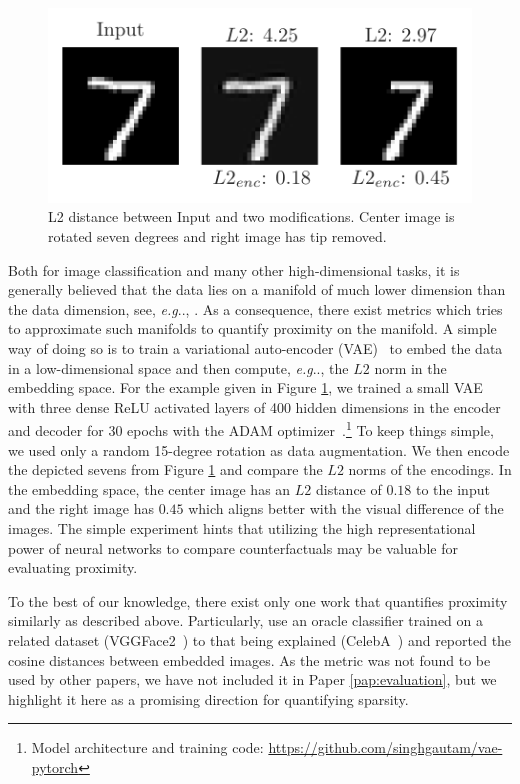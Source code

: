 \documentclass[11pt,a4paper,twoside,openright,final]{memoir}
\makeatletter
\DeclareRobustCommand\onedot{\futurelet\@let@token\@onedot}
\def\@onedot{\ifx\@let@token.\else.\null\fi\xspace}
\def\eg{\emph{e.g}\onedot} \def\Eg{\emph{E.g}\onedot}
\newcommand*{\paperref}[1]{Paper \hyperref[#1]{\ref{#1}}}
\makeatother
\begin{document}
\begin{figure}
    \centering
    \includegraphics{graphics/l2-example.pdf}
    \caption{L2 distance between Input and two modifications. Center image is rotated seven degrees and right image has tip removed.}
    \label{fig:l2-example}
\end{figure}

Both for image classification and many other high-dimensional tasks, it is generally believed that the data lies on a manifold of much lower dimension than the data dimension, see, \eg, \cite[Sec. 3.11.3]{Goodfellow-et-al-2016}.
As a consequence, there exist metrics which tries to approximate such manifolds to quantify proximity on the manifold.
A simple way of doing so is to train a variational auto-encoder (VAE)~\cite{vae} to embed the data in a low-dimensional space and then compute, \eg, the $L2$ norm in the embedding space.
For the example given in Figure \ref{fig:l2-example}, we trained a small VAE with three dense ReLU activated layers of 400 hidden dimensions in the encoder and decoder for 30 epochs with the ADAM optimizer~\cite{adam}.\footnote{Model architecture and training code: \url{https://github.com/singhgautam/vae-pytorch}}
To keep things simple, we used only a random 15-degree rotation as data augmentation.
We then encode the depicted sevens from Figure \ref{fig:l2-example} and compare the $L2$ norms of the encodings.
In the embedding space, the center image has an $L2$ distance of $0.18$ to the input and the right image has $0.45$ which aligns better with the visual difference of the images.
The simple experiment hints that utilizing the high representational power of neural networks to compare counterfactuals may be valuable for evaluating proximity.

To the best of our knowledge, there exist only one work that quantifies proximity similarly as described above.
Particularly, \citet{Rodriguez2021} use an oracle classifier trained on a related dataset (VGGFace2~\cite{vgg2faces}) to that being explained (CelebA~\cite{celeba}) and reported the cosine distances between embedded images.
As the metric was not found to be used by other papers, we have not included it in \paperref{pap:evaluation}, but we highlight it here as a promising direction for quantifying sparsity.
\end{document}
